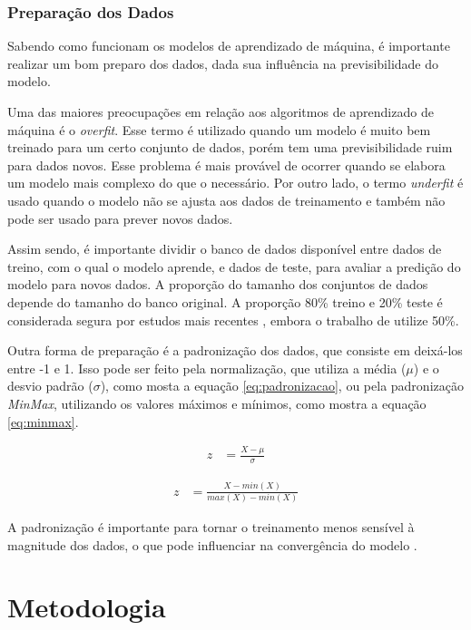 \documentclass[brazil,tf,epusp]{usp}  %
\begin{document}
\subsection{Preparação dos Dados}

Sabendo como funcionam os modelos de aprendizado de máquina, é importante realizar um bom preparo dos dados, dada sua influência na previsibilidade do modelo.

Uma das maiores preocupações em relação aos algoritmos de aprendizado de máquina é o \textit{overfit}. Esse termo é utilizado quando um modelo é muito bem treinado para um certo conjunto de dados, porém tem uma previsibilidade ruim para dados novos. Esse problema é mais provável de ocorrer quando se elabora um modelo mais complexo do que o necessário. Por outro lado, o termo \textit{underfit} é usado quando o modelo não se ajusta aos dados de treinamento e também não pode ser usado para prever novos dados.

Assim sendo, é importante dividir o banco de dados disponível entre dados de treino, com o qual o modelo aprende, e dados de teste, para avaliar a predição do modelo para novos dados. A proporção do tamanho dos conjuntos de dados depende do tamanho do banco original. A proporção 80\% treino e 20\% teste é considerada segura por estudos mais recentes \cite{Bronshtein2017}, embora o trabalho de  utilize 50\%.

Outra forma de preparação é a padronização dos dados, que consiste em deixá-los entre -1 e 1. Isso pode ser feito pela normalização, que utiliza a média ($\mu$) e o desvio padrão ($\sigma$), como mosta a equação \ref{eq:padronizacao}, ou pela padronização \textit{MinMax}, utilizando os valores máximos e mínimos, como mostra a equação \ref{eq:minmax}.

\begin{align}
  z &= \frac{X - \mu}{\sigma}
  \label{eq:padronizacao}
\end{align}

\begin{align}
  z &= \frac{X - min(X)}{max(X) - min(X)}
  \label{eq:minmax}
\end{align}

A padronização é importante para tornar o treinamento menos sensível à magnitude dos dados, o que pode influenciar na convergência do modelo \cite{Raschka2014}.

\chapter{Metodologia}
\end{document}
